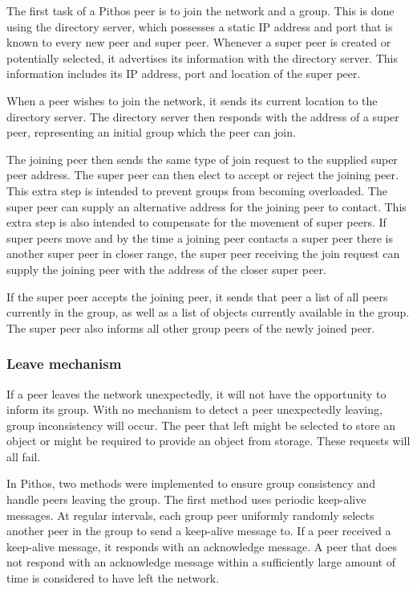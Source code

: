 The first task of a Pithos peer is to join the network and a group. This is done using the directory server, which possesses a static IP address and port that is known to every new peer and super peer. Whenever a super peer is created or potentially selected, it advertises its information with the directory server. This information includes its IP address, port and location of the super peer.

When a peer wishes to join the network, it sends its current location to the directory server. The directory server then responds with the address of a super peer, representing an initial group which the peer can join.

The joining peer then sends the same type of join request to the supplied super peer address. The super peer can then elect to accept or reject the joining peer. This extra step is intended to prevent groups from becoming overloaded. The super peer can supply an alternative address for the joining peer to contact. This extra step is also intended to compensate for the movement of super peers. If super peers move and by the time a joining peer contacts a super peer there is another super peer in closer range, the super peer receiving the join request can supply the joining peer with the address of the closer super peer.

If the super peer accepts the joining peer, it sends that peer a list of all peers currently in the group, as well as a list of objects currently available in the group. The super peer also informs all other group peers of the newly joined peer.

\subsubsection{Leave mechanism}
\label{leave_design}

If a peer leaves the network unexpectedly, it will not have the opportunity to inform its group. With no mechanism to detect a peer unexpectedly leaving, group inconsistency will occur. The peer that left might be selected to store an object or might be required to provide an object from storage. These requests will all fail.

In Pithos, two methods were implemented to ensure group consistency and handle peers leaving the group. The first method uses periodic keep-alive messages. At regular intervals, each group peer uniformly randomly selects another peer in the group to send a keep-alive message to. If a peer received a keep-alive message, it responds with an acknowledge message. A peer that does not respond with an acknowledge message within a sufficiently large amount of time is considered to have left the network.

